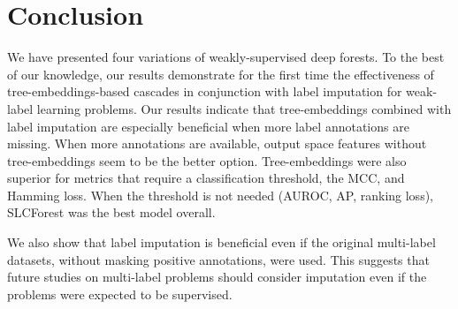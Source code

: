 \documentclass[conference,compsoc]{IEEEtran}
\begin{document}
%        

\section{Conclusion}
\label{sec:conclusion}

We have presented four variations of weakly-supervised deep forests. %
%
To the best of our knowledge, our results demonstrate for the first time the effectiveness of tree-embeddings-based cascades in conjunction with label imputation for weak-label learning problems.
%
Our results indicate that tree-embeddings combined with label imputation are especially beneficial when more label annotations are missing. When more annotations are available, output space features without tree-embeddings seem to be the better option.
%
Tree-embeddings were also superior for metrics that require a classification threshold, the MCC, and Hamming loss.
When the threshold is not needed (AUROC, AP, ranking loss), SLCForest was the best model overall.

We also show that label imputation is beneficial even if the original multi-label datasets, without masking positive annotations, were used. This suggests that future studies on multi-label problems should consider imputation even if the problems were expected to be supervised.
\end{document}

